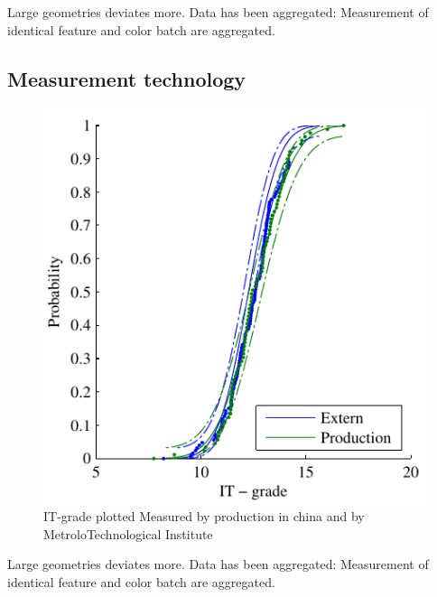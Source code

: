 \documentclass[aip,amsmath, reprint, author-year,nobalancelastpage]{revtex4-1}
\begin{document}
Large geometries deviates more. 
Data has been aggregated: Measurement of identical feature and color batch are aggregated.

\newpage

\subsection{Measurement technology}
\begin{figure}[H]
\includegraphics{ITG_china.pdf}
\caption{\label{fig:ITG_china} IT-grade plotted Measured by production in china and by MetroloTechnological Institute  }
\end{figure}

Large geometries deviates more. 
Data has been aggregated: Measurement of identical feature and color batch are aggregated.

\newpage
\end{document}
